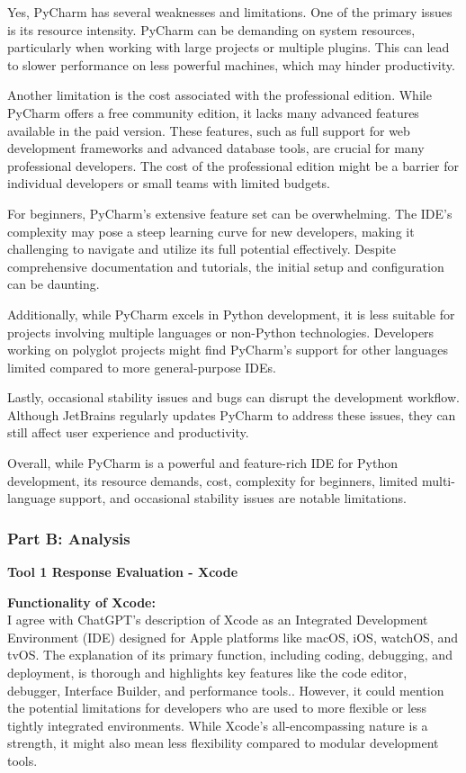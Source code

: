 \documentclass[a4paper, 11pt]{report}
\begin{document}
Yes, PyCharm has several weaknesses and limitations. One of the primary issues is its resource intensity. PyCharm can be demanding on system resources, particularly when working with large projects or multiple plugins. This can lead to slower performance on less powerful machines, which may hinder productivity.

Another limitation is the cost associated with the professional edition. While PyCharm offers a free community edition, it lacks many advanced features available in the paid version. These features, such as full support for web development frameworks and advanced database tools, are crucial for many professional developers. The cost of the professional edition might be a barrier for individual developers or small teams with limited budgets.

For beginners, PyCharm's extensive feature set can be overwhelming. The IDE's complexity may pose a steep learning curve for new developers, making it challenging to navigate and utilize its full potential effectively. Despite comprehensive documentation and tutorials, the initial setup and configuration can be daunting.

Additionally, while PyCharm excels in Python development, it is less suitable for projects involving multiple languages or non-Python technologies. Developers working on polyglot projects might find PyCharm’s support for other languages limited compared to more general-purpose IDEs.

Lastly, occasional stability issues and bugs can disrupt the development workflow. Although JetBrains regularly updates PyCharm to address these issues, they can still affect user experience and productivity.

Overall, while PyCharm is a powerful and feature-rich IDE for Python development, its resource demands, cost, complexity for beginners, limited multi-language support, and occasional stability issues are notable limitations.

\subsubsection{Part B: Analysis}

\textbf{\large{Tool 1 Response Evaluation - Xcode}}

\textbf{Functionality of Xcode:} \\
\noindent I agree with ChatGPT's description of Xcode as an Integrated Development Environment (IDE) designed for Apple platforms like macOS, iOS, watchOS, and tvOS. The explanation of its primary function, including coding, debugging, and deployment, is thorough and highlights key features like the code editor, debugger, Interface Builder, and performance tools.\cite{wentk2014xcode}. However, it could mention the potential limitations for developers who are used to more flexible or less tightly integrated environments. While Xcode's all-encompassing nature is a strength, it might also mean less flexibility compared to modular development tools.
\end{document}
